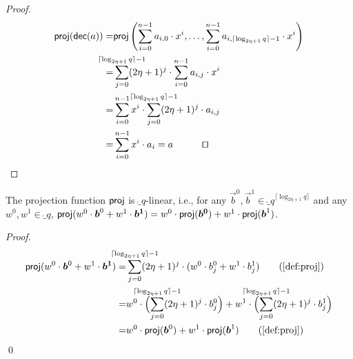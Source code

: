 \begin{proof}
    \begin{align*}
      \proj(\decomp(a)) =& \proj\left(\sum_{i=0}^{n-1} a_{i,0}\cdot x^i, \dots, \sum_{i=0}^{n-1} a_{i,\lceil\log_{2\eta+1} q\rceil -1}\cdot x^i\right)\\
      =& \smashoperator{\sum_{j=0}^{\lceil\log_{2\eta+1} q\rceil -1}} (2\eta+1)^j \cdot \sum_{i=0}^{n-1} a_{i,j}\cdot x^i\\
      =& \sum_{i=0}^{n-1} x^i\cdot \smashoperator{\sum_{j=0}^{\lceil\log_{2\eta+1} q\rceil -1}} (2\eta+1)^j \cdot a_{i,j}\\
      =& \sum_{i=0}^{n-1} x^i\cdot a_i=a\tag*{\qed}
    \end{align*}
\end{proof}
  

\begin{lemma}\label{lem:projislin}
  The projection function $\mathsf{proj}$ is $\ring_q$-linear, i.e., for any $\vec{b}^0,\vec{b}^1 \in \ring_q^{\lceil\log_{2\eta+1} q\rceil}$ and any $w^0,w^1 \in \ring_q$, $\mathsf{proj}(w^0\cdot\boldsymbol{b}^0+w^1\cdot\boldsymbol{b^1}) = w^0\cdot\mathsf{proj}(\boldsymbol{b^0}) + w^1\cdot\mathsf{proj}(\boldsymbol{b}^1)$.
\end{lemma}
\begin{proof}
  \begin{align*}
    \vspace{-1cm}
    \proj(w^0\cdot\vec{b}^0+w^1\cdot\vec{b^1})
    =&\smashoperator{\sum_{j=0}^{\lceil\log_{2\eta+1} q\rceil -1}} (2\eta+1)^j\cdot (w^0\cdot b^0_j+w^1\cdot b^1_j)\tag{\autoref{def:proj}}\\
    =&w^0\cdot \Bigl(\smashoperator{\sum_{j=0}^{\lceil\log_{2\eta+1} q\rceil -1}} (2\eta+1)^j\cdot b^0_j\Bigr) + w^1\cdot\Bigl( \smashoperator{\sum_{j=0}^{\lceil\log_{2\eta+1} q\rceil -1}} (2\eta+1)^j\cdot b^1_j\Bigr)\\
    =&w^0\cdot \proj(\vec{b}^0) + w^1\cdot\proj(\vec{b}^1)\tag{\autoref{def:proj}}
  \end{align*}
  \qed
\end{proof}
